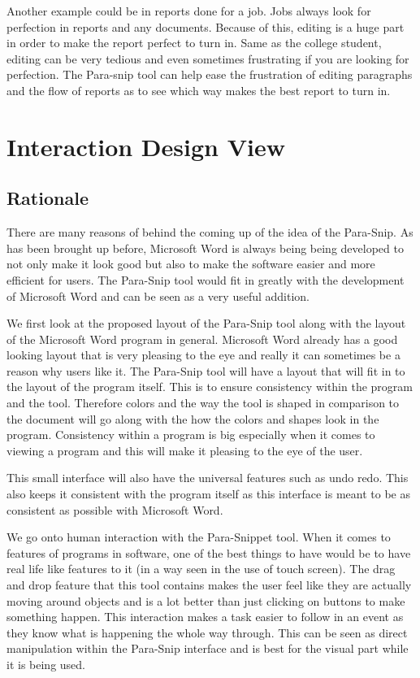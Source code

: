 \documentclass{article}
\begin{document}
{	Another example could be in reports done for a job. Jobs always look for perfection in reports and any documents. Because of this, editing is a huge part in order to make the report perfect to turn in. Same as the college student, editing can be very tedious and even sometimes frustrating if you are looking for perfection. The Para-snip tool can help ease the frustration of editing paragraphs and the flow of reports as to see which way makes the best report to turn in. 

\section{Interaction Design View}

\subsection{Rationale}
	There are many reasons of behind the coming up of the idea of the Para-Snip. As has been brought up before, Microsoft Word is always being being developed to not only make it look good but also to make the software easier and more efficient for users. The Para-Snip tool would fit in greatly with the development of Microsoft Word and can be seen as a very useful addition.
	
	We first look at the proposed layout of the Para-Snip tool along with the layout of the Microsoft Word program in general. Microsoft Word already has a good looking layout that is very pleasing to the eye and really it can sometimes be a reason why users like it. The Para-Snip tool will have a layout that will fit in to the layout of the program itself. This is to ensure consistency within the program and the tool. Therefore colors and the way the tool is shaped in comparison to the document will go along with the how the colors and shapes look in the program. Consistency within a program is big especially when it comes to viewing a program and this will make it pleasing to the eye of the user.
	
	This small interface will also have the universal features such as undo redo. This also keeps it consistent with the program itself as this interface is meant to be as consistent as possible with Microsoft Word.
	
	We go onto human interaction with the Para-Snippet tool. When it comes to features of programs in software, one of the best things to have would be to have real life like features to it (in a way seen in the use of touch screen). The drag and drop feature that this tool contains makes the user feel like they are actually moving around objects and is a lot better than just clicking on buttons to make something happen. This interaction makes a task easier to follow in an event as they know what is happening the whole way through. This can be seen as direct manipulation within the Para-Snip interface and is best for the visual part while it is being used.
	
}
\end{document}
